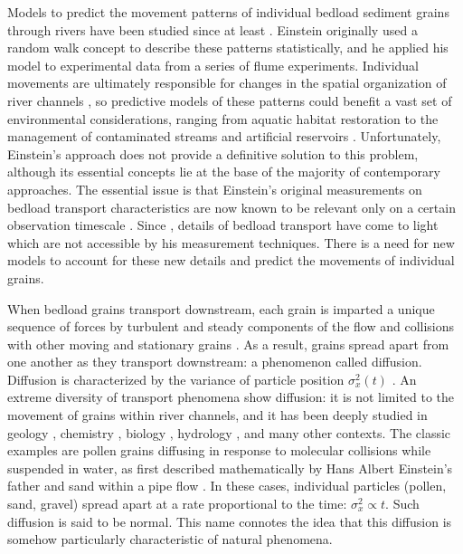 \documentclass[]{agujournal2018}
\begin{document}
Models to predict the movement patterns of individual bedload sediment grains through rivers have been studied since at least \citet{Einstein1937}.
Einstein originally used a random walk concept to describe these patterns statistically, and he applied his model to experimental data from a series of flume experiments.
Individual movements are ultimately responsible for changes in the spatial organization of river channels \citep{Hassan2017}, so predictive models of these patterns could benefit a vast set of environmental considerations, ranging from aquatic habitat restoration \citep{Hauer2016} to the management of contaminated streams \citep{Macklin2006} and artificial reservoirs \citep{Schleiss2016}.
Unfortunately, Einstein's approach does not provide a definitive solution to this problem, although its essential concepts lie at the base of the majority of contemporary approaches.
The essential issue is that Einstein's original measurements on bedload transport characteristics are now known to be relevant only on a certain observation timescale \citep{Nikora2001a}.
Since \citet{Einstein1937}, details of bedload transport have come to light which are not accessible by his measurement techniques.
There is a need for new models to account for these new details and predict the movements of individual grains.

When bedload grains transport downstream, each grain is imparted a unique sequence of forces by turbulent and steady components of the flow \citep{} and collisions with other moving and stationary grains \citep{Gordon1972}. 
As a result, grains spread apart from one another as they transport downstream: a phenomenon called diffusion.
Diffusion is characterized by the variance of particle position $\sigma_x^2(t)$ \citep{Furbish2017}.
An extreme diversity of transport phenomena show diffusion: it is not limited to the movement of grains within river channels, and it has been deeply studied in geology \citep{Berkowitz2006}, chemistry \citep{Shugard1976}, biology \citep{Sokolov2012}, hydrology \citep{Yang2019}, and many other contexts.
The classic examples are pollen grains diffusing in response to molecular collisions while suspended in water, as first described mathematically by Hans Albert Einstein's father \citep{Einstein1905} and sand within a pipe flow \citep{Taylor1920}.
In these cases, individual particles (pollen, sand, gravel) spread apart at a rate proportional to the time: $\sigma_x^2 \propto t$. Such diffusion is said to be normal.
This name connotes the idea that this diffusion is somehow particularly characteristic of natural phenomena.
\end{document}
